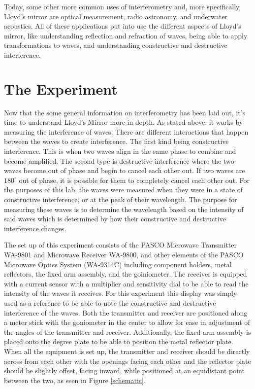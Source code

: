 \documentclass[rc]{physicsinprogress}
\begin{document}
    Today, some other more common uses of interferometry and, more specifically, Lloyd's mirror are optical measurement, radio astronomy, and underwater acoustics. All of these applications put into use the different aspects of Lloyd's mirror, like understanding reflection and refraction of waves, being able to apply transformations to waves, and understanding constructive and destructive interference.


\section{The Experiment}
     Now that the some general information on interferometry has been laid out, it's time to understand Lloyd's Mirror more in depth. As stated above, it works by measuring the interference of waves. There are different interactions that happen between the waves to create interference. The first kind being constructive interference. This is when two waves align in the same phase to combine and become amplified. The second type is destructive interference where the two waves become out of phase and begin to cancel each other out. If two waves are $180^\circ$ out of phase, it is possible for them to completely cancel each other out. For the purposes of this lab, the waves were measured when they were in a state of constructive interference, or at the peak of their wavelength. The purpose for measuring these waves is to determine the wavelength based on the intensity of said waves which is determined by how their constructive and destructive interference changes.
     
     The set up of this experiment consists of the PASCO Microwave Transmitter WA-9801 and Microwave Receiver WA-9800, and other elements of the PASCO Microwave Optics System (WA-9314C) including component holders, metal reflectors, the fixed arm assembly, and the goiniometer. The receiver is equipped with a current sensor with a multiplier and sensitivity dial to be able to read the intensity of the waves it receives. For this experiment this display was simply used as a reference to be able to note the constructive and destructive interference of the waves. Both the transmitter and receiver are positioned along a meter stick with the goniometer in the center to allow for ease in adjustment of the angles of the transmitter and receiver. Additionally, the fixed arm assembly is placed onto the degree plate to be able to position the metal reflector plate. When all the equipment is set up, the transmitter and receiver should be directly across from each other with the openings facing each other and the reflector plate should be slightly offset, facing inward, while positioned at an equidistant point between the two, as seen in Figure \ref{schematic}.
\end{document}
